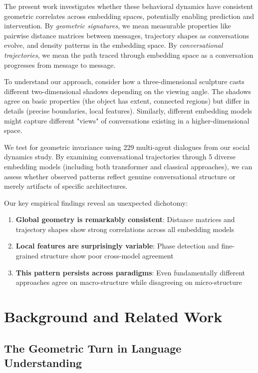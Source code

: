 \documentclass[11pt,letterpaper]{article}
\newcommand{\totalConversations}{229}
\newcommand{\numEmbeddingModels}{5}
\begin{document}
The present work investigates whether these behavioral dynamics have consistent geometric correlates across embedding spaces, potentially enabling prediction and intervention. By \textit{geometric signatures}, we mean measurable properties like pairwise distance matrices between messages, trajectory shapes as conversations evolve, and density patterns in the embedding space. By \textit{conversational trajectories}, we mean the path traced through embedding space as a conversation progresses from message to message.

To understand our approach, consider how a three-dimensional sculpture casts different two-dimensional shadows depending on the viewing angle. The shadows agree on basic properties (the object has extent, connected regions) but differ in details (precise boundaries, local features). Similarly, different embedding models might capture different "views" of conversations existing in a higher-dimensional space.

We test for geometric invariance using \totalConversations{} multi-agent dialogues from our social dynamics study. By examining conversational trajectories through \numEmbeddingModels{} diverse embedding models (including both transformer and classical approaches), we can assess whether observed patterns reflect genuine conversational structure or merely artifacts of specific architectures.

Our key empirical findings reveal an unexpected dichotomy:
\begin{enumerate}
\item \textbf{Global geometry is remarkably consistent}: Distance matrices and trajectory shapes show strong correlations across all embedding models
\item \textbf{Local features are surprisingly variable}: Phase detection and fine-grained structure show poor cross-model agreement
\item \textbf{This pattern persists across paradigms}: Even fundamentally different approaches agree on macro-structure while disagreeing on micro-structure
\end{enumerate}

\section{Background and Related Work}

\subsection{The Geometric Turn in Language Understanding}
\end{document}
